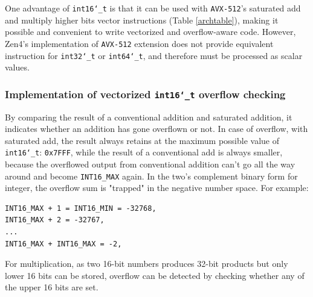 \documentclass[logo,bsc,singlespacing,parskip]{infthesis}
\newcommand{\dtshort}{\texttt{int16\char`_t}}
\newcommand{\dtint}{\texttt{int32\char`_t}}
\newcommand{\dtlong}{\texttt{int64\char`_t}}
\begin{document}

One advantage of \dtshort{} is that it can be used with \texttt{AVX-512}'s
saturated add and multiply higher bits vector instructions (Table
\ref{archtable}), making it possible and convenient to write vectorized and
overflow-aware code. However, Zen4's implementation of \texttt{AVX-512} extension does
not provide equivalent instruction for \dtint{} or \dtlong{},
and therefore must be processed as scalar values.


\subsubsection{Implementation of vectorized \dtshort{} overflow checking}
\label{sec:i16-overflow-checking}
By comparing the result of a conventional addition and saturated addition, it
indicates whether an addition has gone overflown or not. In case of overflow,
with saturated add, the result always retains at the maximum possible value of
\dtshort{}: \texttt{0x7FFF}, while the result of a conventional add is
always smaller, because the overflowed output from conventional addition can't
go all the way around and become \texttt{INT16\_MAX} again. In the two's
complement binary form for integer, the overflow sum is "trapped" in the
negative number space. For example: 
\begin{verbatim}
INT16_MAX + 1 = INT16_MIN = -32768, 
INT16_MAX + 2 = -32767, 
...
INT16_MAX + INT16_MAX = -2, 
\end{verbatim}

For multiplication, as two 16-bit numbers produces 32-bit products but only
lower 16 bits can be stored, overflow can be detected by checking whether any of
the upper 16 bits are set. 
\end{document}
